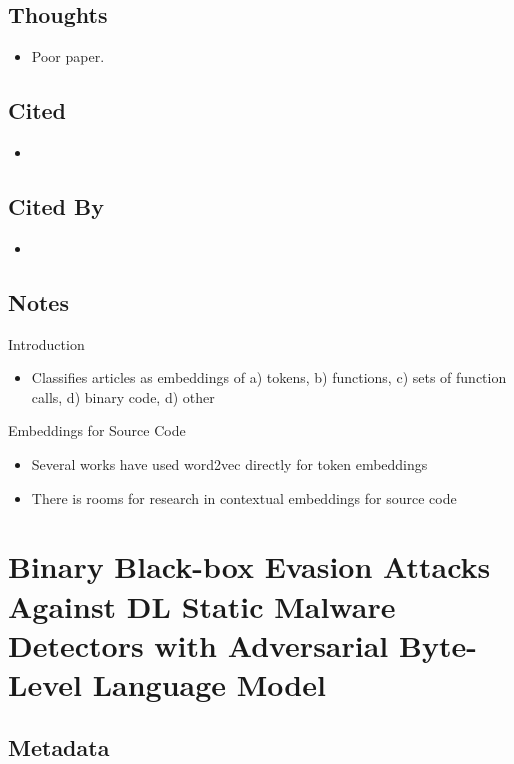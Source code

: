 \documentclass{article}
\begin{document}
\subsection*{Thoughts}
\begin{itemize}
\item Poor paper.
\end{itemize}

\subsection*{Cited}
\begin{itemize}
\item
\end{itemize}

\subsection*{Cited By}
\begin{itemize}
\item
\end{itemize}

\subsection*{Notes}

Introduction
\begin{itemize}
\item Classifies articles as embeddings of a) tokens, b) functions, c) sets of function calls, d) binary code, d) other
\end{itemize}
Embeddings for Source Code
\begin{itemize}
\item Several works have used word2vec directly for token embeddings
\item There is rooms for research in contextual embeddings for source code
\end{itemize}

\pagebreak


\section*{Binary Black-box Evasion Attacks Against DL Static Malware Detectors with Adversarial Byte-Level Language Model}

\subsection*{Metadata}
\end{document}
